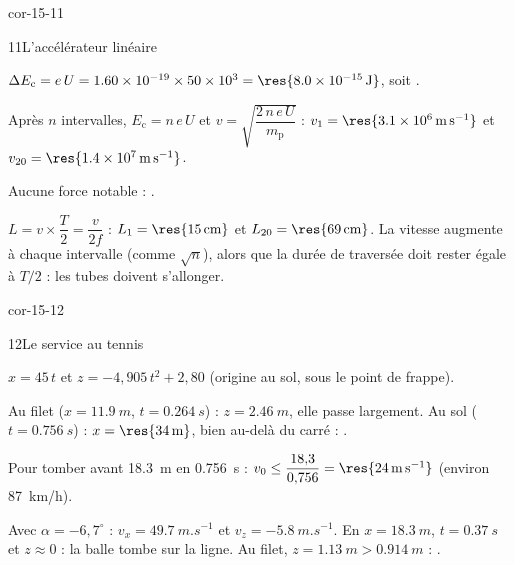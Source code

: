 \begin{blocLivre}{cor-15-11}
\begin{corrige}{11}{L'accélérateur linéaire}
\begin{questions}
\item $\Delta E_\mathrm{c}=e\,U=\num{1.60e-19}\times\num{50e3}=\res{\qty{8,0e-15}{J}}$, soit .
\item Après $n$ intervalles, $E_\mathrm{c}=n\,e\,U$ et $v=\sqrt{\dfrac{2\,n\,e\,U}{m_\mathrm{p}}}$ : $v_1=\res{\qty{3,1e6}{m.s^{-1}}}$
et $v_{20}=\res{\qty{1,4e7}{m.s^{-1}}}$.
\item Aucune force notable : .
\item $L=v\times\dfrac{T}{2}=\dfrac{v}{2f}$ : $L_1=\res{\qty{15}{cm}}$ et $L_{20}=\res{\qty{69}{cm}}$. La vitesse augmente à chaque
intervalle (comme $\sqrt{n}$), alors que la durée de traversée doit rester égale à $T/2$ : les tubes doivent s'allonger.
\end{questions}
\end{corrige}
\end{blocLivre}
\begin{blocLivre}{cor-15-12}
\begin{corrige}{12}{Le service au tennis}
\begin{questions}
\item $x=45\,t$ et $z=-4{,}905\,t^2+2{,}80$ (origine au sol, sous le point de frappe).
\item Au filet ($x=\qty{11,9}{m}$, $t=\qty{0,264}{s}$) : $z=\qty{2,46}{m}$, elle passe largement. Au sol ($t=\qty{0,756}{s}$) :
$x=\res{\qty{34}{m}}$, bien au-delà du carré : .
\item Pour tomber avant \qty{18,3}{m} en \qty{0,756}{s} : $v_0\leq\dfrac{18{,}3}{0{,}756}=\res{\qty{24}{m.s^{-1}}}$ (environ 87~km/h).
\item Avec $\alpha=-6{,}7^\circ$ : $v_x=\qty{49,7}{m.s^{-1}}$ et $v_z=\qty{-5,8}{m.s^{-1}}$. En $x=\qty{18,3}{m}$, $t=\qty{0,37}{s}$ et
$z\approx0$ : la balle tombe sur la ligne. Au filet, $z=\qty{1,13}{m}>\qty{0,914}{m}$ : .
\end{questions}
\end{corrige}
\end{blocLivre}
